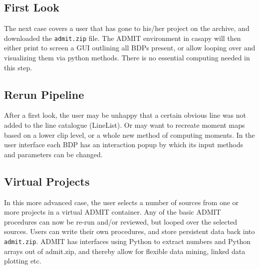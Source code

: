 \documentclass{article}
\begin{document}
\subsection{First Look}

The next case covers a user that has gone to his/her project on the archive,
and downloaded the {\tt admit.zip} file. The ADMIT environment in casapy
will then either print to screen a GUI outlining all BDPs present, or
allow looping over and visualizing them via python methods. There is no
essential computing needed in this step.

\subsection{Rerun Pipeline}

After a first look, the user may be unhappy that a certain obvious line
was not added to the line catalogue (LineList). Or may want to recreate
moment maps based on a lower clip level, or a whole new method of
computing moments. In the user interface each BDP has an
interaction popup by which its input methods and parameters can be changed.

\subsection{Virtual Projects}

In this more advanced case, the user selects a number of sources from one
or more projects in a virtual ADMIT container. Any of the basic ADMIT procedures
can now be re-run and/or reviewed, but looped over the selected sources.
Users can write their own procedures,
and store persistent data back into {\tt admit.zip}. ADMIT has interfaces
using Python to extract numbers and Python arrays out of admit.zip, and thereby
allow for flexible data mining, linked data plotting etc.

%
%
%
%
%  
%
%
%
%
\end{document}
